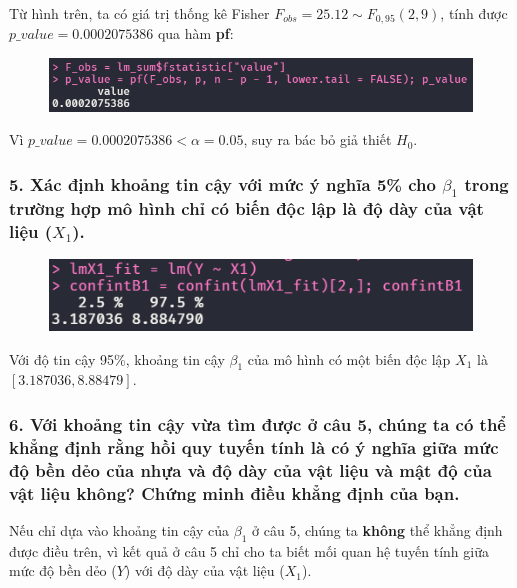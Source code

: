 \documentclass[a4paper]{article}
\theoremstyle{nonumberplain}
\begin{document}
Từ hình trên, ta có giá trị thống kê Fisher $F_{obs} = 25.12 \sim F_{0,95}(2,9)$, tính được $p\_value = 0.0002075386$ qua hàm \textbf{pf}:
\begin{figure}[h!]
	\centering
	\includegraphics[width=0.7\linewidth]{bai-2-4-p_value}
	\label{fig:bai-2-4-pvalue}
\end{figure}

Vì $p\_value = 0.0002075386 < \alpha = 0.05$, suy ra bác bỏ giả thiết $H_0$.

\subsubsection*{5. Xác định khoảng tin cậy với mức ý nghĩa 5\% cho $\beta_1$ trong trường hợp mô hình chỉ có biến độc lập là độ dày của vật liệu ($X_1$).}

\begin{figure}[h!]
	\centering
	\includegraphics[width=0.7\linewidth]{bai-2-5-confint-beta1}
	\label{fig:bai-2-5-confint-beta1}
\end{figure}

Với độ tin cậy 95\%, khoảng tin cậy $\beta_1$ của mô hình có một biến độc lập $X_1$ là $[3.187036,8.88479]$.

\subsubsection*{6. Với khoảng tin cậy vừa tìm được ở câu 5, chúng ta có thể khẳng định rằng hồi quy tuyến tính là có ý nghĩa giữa mức độ bền dẻo của nhựa và độ dày của vật liệu và mật độ của vật liệu không? Chứng minh điều khẳng định của bạn.}

Nếu chỉ dựa vào khoảng tin cậy của $\beta_1$ ở câu 5, chúng ta \textbf{không} thể khẳng định được điều trên, vì kết quả ở câu 5 chỉ cho ta biết mối quan hệ tuyến tính giữa mức độ bền dẻo ($Y$) với độ dày của vật liệu ($X_1$).
\end{document}
